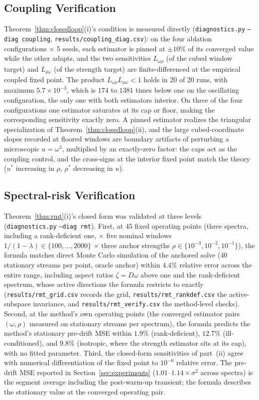 \documentclass[11pt]{article}
\begin{document}
\subsection{Coupling Verification}
Theorem~\ref{thm:closedloop}(i)'s condition is measured directly (\texttt{diagnostics.py} \texttt{--diag coupling}, \texttt{results/coupling\_diag.csv}): on the four ablation configurations $\times$ 5 seeds, each estimator is pinned at $\pm 10\%$ of its converged value while the other adapts, and the two sensitivities $L_{\omega\rho}$ (of the cubed window target) and $L_{\rho\omega}$ (of the strength target) are finite-differenced at the empirical coupled fixed point.
The product $L_{\omega\rho} L_{\rho\omega} < 1$ holds in 20 of 20 runs, with maximum $5.7 \times 10^{-3}$, which is $174$ to $1381$ times below one on the oscillating configuration, the only one with both estimators interior.
On three of the four configurations one estimator saturates at its cap or floor, making the corresponding sensitivity exactly zero. A pinned estimator realizes the triangular specialization of Theorem~\ref{thm:closedloop}(ii), and the large cubed-coordinate slopes recorded at floored windows are boundary artifacts of perturbing a microscopic $u = \omega^3$, multiplied by an exactly-zero factor: the caps act as the coupling control, and the cross-signs at the interior fixed point match the theory ($u^*$ increasing in $\rho$, $\rho^*$ decreasing in $u$).

\subsection{Spectral-risk Verification}
Theorem~\ref{thm:rmt}(i)'s closed form was validated at three levels (\texttt{diagnostics.py} \texttt{--diag rmt}).
First, at $45$ fixed operating points (three spectra, including a rank-deficient one, $\times$ five nominal windows $1/(1-\lambda) \in \{100, \dots, 2000\}$ $\times$ three anchor strengths $\rho \in \{10^{-3}, 10^{-2}, 10^{-1}\}$), the formula matches direct Monte Carlo simulation of the anchored solve ($40$ stationary streams per point, oracle anchor) within $4.4\%$ relative error across the entire range, including aspect ratios $\zeta = D\omega$ above one and the rank-deficient spectrum, whose active directions the formula restricts to exactly (\texttt{results/rmt\_grid.csv} records the grid, \texttt{results/rmt\_rankdef.csv} the active-subspace invariance, and \texttt{results/rmt\_verify.csv} the method-level checks).
Second, at the method's own operating points (the converged estimator pairs $(\omega, \rho)$ measured on stationary streams per spectrum), the formula predicts the method's stationary pre-drift MSE within $1.9\%$ (rank-deficient), $12.7\%$ (ill-conditioned), and $9.8\%$ (isotropic, where the strength estimator sits at its cap), with no fitted parameter.
Third, the closed-form sensitivities of part~(ii) agree with numerical differentiation of the fixed point to $10^{-6}$ relative error.
The pre-drift MSE reported in Section~\ref{sec:experiments} ($1.01$--$1.14 \times \sigma^2$ across spectra) is the segment average including the post-warm-up transient; the formula describes the stationary value at the converged operating pair.
\end{document}
